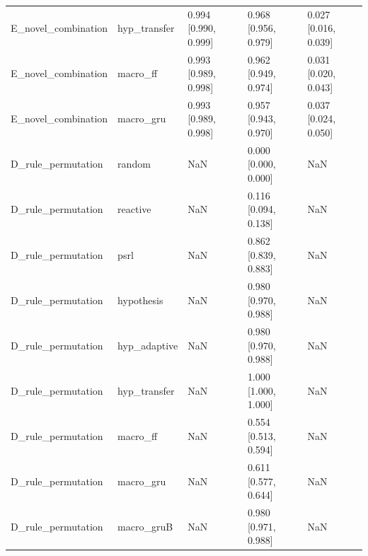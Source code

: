 \begin{tabular}{lllll}
E\_novel\_combination & hyp\_transfer & 0.994 [0.990, 0.999] & 0.968 [0.956, 0.979] & 0.027 [0.016, 0.039] \\
E\_novel\_combination & macro\_ff & 0.993 [0.989, 0.998] & 0.962 [0.949, 0.974] & 0.031 [0.020, 0.043] \\
E\_novel\_combination & macro\_gru & 0.993 [0.989, 0.998] & 0.957 [0.943, 0.970] & 0.037 [0.024, 0.050] \\
D\_rule\_permutation & random & NaN & 0.000 [0.000, 0.000] & NaN \\
D\_rule\_permutation & reactive & NaN & 0.116 [0.094, 0.138] & NaN \\
D\_rule\_permutation & psrl & NaN & 0.862 [0.839, 0.883] & NaN \\
D\_rule\_permutation & hypothesis & NaN & 0.980 [0.970, 0.988] & NaN \\
D\_rule\_permutation & hyp\_adaptive & NaN & 0.980 [0.970, 0.988] & NaN \\
D\_rule\_permutation & hyp\_transfer & NaN & 1.000 [1.000, 1.000] & NaN \\
D\_rule\_permutation & macro\_ff & NaN & 0.554 [0.513, 0.594] & NaN \\
D\_rule\_permutation & macro\_gru & NaN & 0.611 [0.577, 0.644] & NaN \\
D\_rule\_permutation & macro\_gruB & NaN & 0.980 [0.971, 0.988] & NaN \\
\bottomrule
\end{tabular}
